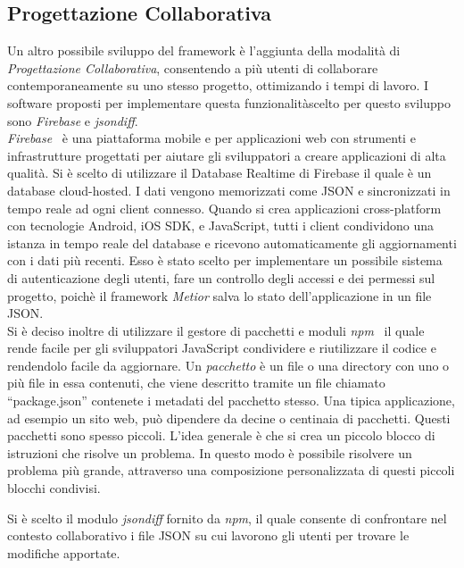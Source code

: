 \subsection{Progettazione Collaborativa}
\label{sec:conclusions_section_2_sub_2}
Un altro possibile sviluppo del framework è l'aggiunta della modalità di \emph{Progettazione Collaborativa}, consentendo a più utenti
di collaborare contemporaneamente su uno stesso progetto, ottimizando i tempi di lavoro.
I software proposti per implementare questa funzionalitàscelto per questo sviluppo sono
\emph{Firebase} e \emph{jsondiff}.\\
\emph{Firebase}~\cite{firebase} è una piattaforma mobile e per applicazioni web con strumenti e infrastrutture progettati
per aiutare gli sviluppatori a creare applicazioni di alta qualità. Si è scelto di utilizzare
il Database Realtime di Firebase  il quale è un database cloud-hosted. I dati vengono memorizzati come JSON e
sincronizzati in tempo reale ad ogni client connesso. Quando si crea applicazioni cross-platform con
tecnologie Android, iOS SDK, e JavaScript, tutti i client condividono una istanza in tempo reale del
database e ricevono automaticamente gli aggiornamenti con i dati più recenti.
Esso è stato scelto per implementare un possibile sistema di autenticazione degli utenti,
fare un controllo degli accessi e dei permessi sul progetto,
poichè il framework \emph{Metior} salva lo stato dell'applicazione in un file JSON.\\
Si è deciso inoltre di utilizzare il gestore di pacchetti e moduli \emph{npm}~\cite{npm} il quale rende facile per gli sviluppatori
JavaScript condividere e riutilizzare il codice e rendendolo facile da aggiornare.
Un \emph{pacchetto} è un file o una directory con uno o più file in essa contenuti, che viene descritto tramite un file chiamato ``package.json''
contenete i metadati del pacchetto stesso. Una tipica applicazione, ad esempio un sito web, può dipendere da decine o centinaia di pacchetti.
Questi pacchetti sono spesso piccoli. L'idea generale è che si crea un piccolo blocco di istruzioni che risolve un problema.
In questo modo è possibile risolvere un problema più grande, attraverso una composizione personalizzata di questi piccoli
blocchi condivisi.
\newpage

Si è scelto il modulo \emph{jsondiff} fornito da \emph{npm}, il quale consente di confrontare nel contesto collaborativo
i file JSON su cui lavorono gli utenti per trovare le modifiche apportate.\\

